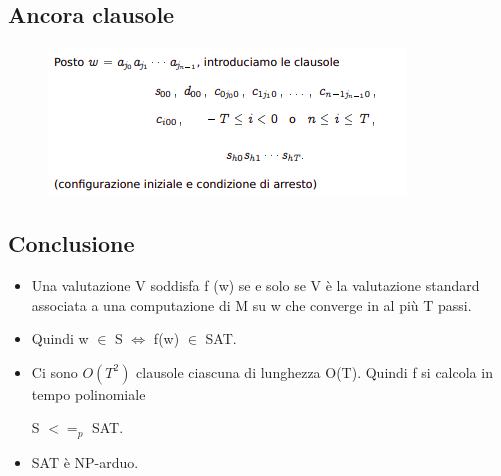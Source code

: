 \subsection{Ancora clausole}
\begin{figure}[htp]
    \centering
    \includegraphics[scale=0.9]{tesi_stile/img/foto11cap12.png}
\end{figure}
\subsection{Conclusione}
\begin{itemize}
    \item Una valutazione V soddisfa f (w) se e solo se V è la valutazione standard associata a una computazione di M su w che converge in al più T passi.
    
    \item Quindi w $\in$ S $\Longleftrightarrow$ f(w) $\in$ SAT.
    
    \item Ci sono $O(T^2)$ clausole ciascuna di lunghezza O(T). Quindi f si calcola in tempo polinomiale
    
    \begin{center}
        S $<=_p$ SAT.
    \end{center}
    
    \item SAT è NP-arduo.
\end{itemize}